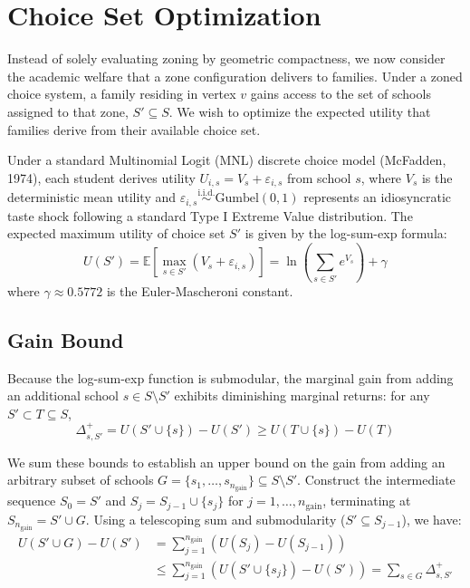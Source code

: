 \documentclass{article}
\begin{document}
\section{Choice Set Optimization}

Instead of solely evaluating zoning by geometric compactness, we now consider the academic welfare that a zone configuration delivers to families. Under a zoned choice system, a family residing in vertex $v$ gains access to the set of schools assigned to that zone, $S' \subseteq S$. We wish to optimize the expected utility that families derive from their available choice set.

Under a standard Multinomial Logit (MNL) discrete choice model (McFadden, 1974), each student derives utility $U_{i,s} = V_s + \varepsilon_{i,s}$ from school $s$, where $V_s$ is the deterministic mean utility and $\varepsilon_{i,s} \stackrel{\text{i.i.d.}}{\sim} \text{Gumbel}(0, 1)$ represents an idiosyncratic taste shock following a standard Type I Extreme Value distribution. The expected maximum utility of choice set $S'$ is given by the log-sum-exp formula:
\begin{equation}
U(S') = \mathbb{E} \left[ \max_{s \in S'} (V_s + \varepsilon_{i,s}) \right] = \ln \left( \sum_{s \in S'} e^{V_s} \right) + \gamma
\end{equation}
where $\gamma \approx 0.5772$ is the Euler-Mascheroni constant.

\subsection{Gain Bound}
Because the log-sum-exp function is submodular, the marginal gain from adding an additional school $s \in S \setminus S'$ exhibits diminishing marginal returns: for any $S' \subset T \subseteq S$,
\begin{equation}\label{eq:upper-bound}
\Delta^+_{s, S'} = U(S' \cup \{s\}) - U(S') \geq U(T \cup \{s\}) - U(T)
\end{equation}

We sum these bounds to establish an upper bound on the gain from adding an arbitrary subset of schools $G = \{s_1, \dots, s_{n_{\text{gain}}}\} \subseteq S \setminus S'$. Construct the intermediate sequence $S_0 = S'$ and $S_j = S_{j-1} \cup \{s_j\}$ for $j = 1, \dots, n_{\text{gain}}$, terminating at $S_{n_{\text{gain}}} = S' \cup G$. Using a telescoping sum and submodularity ($S' \subseteq S_{j-1}$), we have:
\begin{equation} \label{eq:total-gain-bound}
\begin{aligned}
U(S' \cup G) - U(S') &= \sum_{j=1}^{n_{\text{gain}}} \left( U(S_j) - U(S_{j-1}) \right) \\
&\leq \sum_{j=1}^{n_{\text{gain}}} \left( U(S' \cup \{s_j\}) - U(S') \right) = \sum_{s \in G} \Delta^+_{s, S'}
\end{aligned}
\end{equation}
\end{document}
